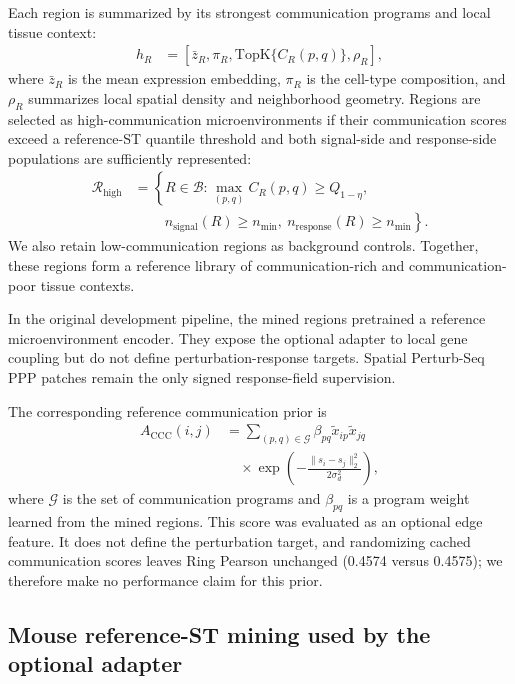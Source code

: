\documentclass[sigconf,review,balance=false]{acmart}
\newcommand{\ppp}{\textsc{PPP}\xspace}
\begin{document}
Each region is summarized by its strongest communication programs and local tissue context:
\[
\begin{aligned}
h_R
&=
[\bar z_R,\pi_R,\mathrm{TopK}\{C_R(p,q)\},\rho_R],
\end{aligned}
\]
where $\bar z_R$ is the mean expression embedding, $\pi_R$ is the cell-type composition, and $\rho_R$ summarizes local spatial density and neighborhood geometry. Regions are selected as high-communication microenvironments if their communication scores exceed a reference-ST quantile threshold and both signal-side and response-side populations are sufficiently represented:
\[
\begin{aligned}
\mathcal R_{\mathrm{high}}
&=
\left\{
R\in\mathcal B:
\max_{(p,q)}C_R(p,q)\ge Q_{1-\eta},
\right.\\
&\qquad\left.
\ n_{\mathrm{signal}}(R)\ge n_{\min},
\ n_{\mathrm{response}}(R)\ge n_{\min}
\right\}.
\end{aligned}
\]
We also retain low-communication regions as background controls. Together, these regions form a reference library of communication-rich and communication-poor tissue contexts.

In the original development pipeline, the mined regions pretrained a
reference microenvironment encoder. They expose the optional adapter to local
gene coupling but do not define perturbation-response targets. Spatial
Perturb-Seq \ppp patches remain the only signed response-field supervision.

The corresponding reference communication prior is
\[
\begin{aligned}
A_{\mathrm{CCC}}(i,j)
&=
\sum_{(p,q)\in\mathcal G}
\beta_{pq}
\tilde x_{ip}\tilde x_{jq}\\
&\quad \times
\exp\!\left(
-\frac{\|s_i-s_j\|_2^2}{2\sigma_d^2}
\right),
\end{aligned}
\]
where $\mathcal G$ is the set of communication programs and $\beta_{pq}$ is a
program weight learned from the mined regions. This score was evaluated as an
optional edge feature. It does not define the perturbation target, and
randomizing cached communication scores leaves Ring Pearson unchanged
(0.4574 versus 0.4575); we therefore make no performance claim for this prior.

\subsection{Mouse reference-ST mining used by the optional adapter}
\label{app:mouse_microenvironment_mining}
\end{document}
